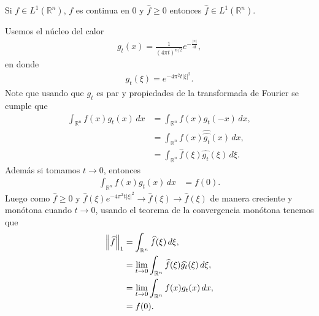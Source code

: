 \begin{homeworkProblem}
  Si $f\in L^1(\mathbb{R}^{n})$, $f$ es continua en $0$ y $\hat{f}\geq 0$ entonces $\hat{f}\in L^{1}(\mathbb{R}^{n})$. 
  \begin{solution}
    Usemos el núcleo del calor
    \begin{align*}
      g_{t}(x)=\frac{1}{(4\pi t)^{n/2}}e^{-\frac{|x|}{4t}},
    \end{align*}
    en donde
    \begin{align*}
      \hat{g_t}(\xi)=e^{-4\pi^2t|\xi|^2}.
    \end{align*}
    Note que usando que $g_t$ es par y propiedades de la transformada de Fourier se cumple que 
    \begin{align*}
      \int_{\mathbb{R}^{n}}f(x)g_{t}(x)\, dx&=\int_{\mathbb{R}^{n}}f(x)g_{t}(-x)\, dx,\\
      &=\int_{\mathbb{R}^{n}}f(x)\hat{\hat{g_{t}}}(x)\, dx,\\
      &=\int_{\mathbb{R}^{n}}\hat{f}(\xi)\hat{g_t}(\xi)\, d\xi.
    \end{align*}
    Además si tomamos $t\to 0$, entonces
    \begin{align*}
      \int_{\mathbb{R}^{n}}f(x)g_t(x)\, dx&=f(0).
    \end{align*}
    Luego como $\hat{f}\geq 0$ y $\hat{f}(\xi)e^{-4\pi^2t|\xi|^2}\to \hat{f}(\xi)\to \hat{f}(\xi)$ de manera creciente y monótona cuando $t\to 0$, usando el teorema de la convergencia monótona tenemos que 
    \begin{align*}
      \left\|\widehat{f}\right\|_{1}&=\int_{\mathbb{R}^{n}}\widehat{f}(\xi)\, d\xi,\\
      &=\lim_{t \to 0}\int_{\mathbb{R}^{n}}\widehat{f}(\xi)\widehat{g_{t}}(\xi)\, d\xi,\\
      &=\lim_{t \to 0}\int_{\mathbb{R}^{n}}f(x)g_t(x)\, dx,\\
      &=f(0).
    \end{align*}
  \end{solution}
\end{homeworkProblem}
